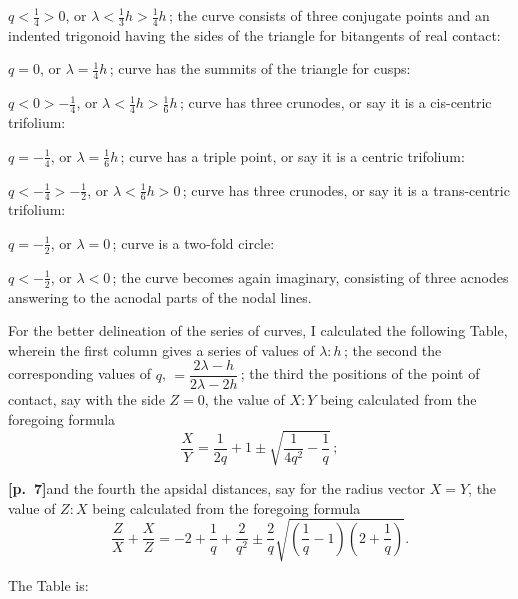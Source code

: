 \documentclass[11pt,a4paper]{article}
\begin{document}
\smallskip

$q < \tfrac{1}{4} > 0$, or $\lambda < \tfrac{1}{3}h > \tfrac{1}{4}h$\,; the curve consists of three conjugate points and an indented trigonoid having the sides of the triangle for bitangents of real contact:

\smallskip

$q = 0$, or $\lambda = \tfrac{1}{4}h$\,; curve has the summits of the triangle for cusps:

\smallskip

$q < 0 > -\tfrac{1}{4}$, or $\lambda < \tfrac{1}{4}h > \tfrac{1}{6}h$\,; curve has three crunodes, or say it is a cis-centric trifolium:

\smallskip

$q = -\tfrac{1}{4}$, or $\lambda = \tfrac{1}{6}h$\,; curve has a triple point, or say it is a centric trifolium:

\smallskip

$q < -\tfrac{1}{4} > -\tfrac{1}{2}$, or $\lambda < \tfrac{1}{6}h > 0$\,; curve has three crunodes, or say it is a trans-centric trifolium:

\smallskip

$q = -\tfrac{1}{2}$, or $\lambda = 0$\,; curve is a two-fold circle:

\smallskip

$q < -\tfrac{1}{2}$, or $\lambda < 0$\,; the curve becomes again imaginary, consisting of three acnodes answering to the acnodal parts of the nodal lines.

\bigskip

For the better delineation of the series of curves, I calculated the following Table, wherein the first column gives a series of values of $\lambda : h$\,; the second the corresponding values of $q$, $= \dfrac{2\lambda - h}{2\lambda - 2h}$\,; the third the positions of the point of contact, say with the side $Z=0$, the value of $X : Y$ being calculated from the foregoing formula
\[
\frac{X}{Y} = \frac{1}{2q} + 1 \pm \sqrt{\frac{1}{4q^{2}} - \frac{1}{q}}\,;
\]

\noindent\textbf{[p.~7]}\quad and the fourth the apsidal distances, say for the radius vector $X = Y$, the value of $Z : X$ being calculated from the foregoing formula
\[
\frac{Z}{X} + \frac{X}{Z} = -2 + \frac{1}{q} + \frac{2}{q^{2}} \pm \frac{2}{q}\sqrt{\left(\frac{1}{q} - 1\right)\left(2 + \frac{1}{q}\right)}.
\]

The Table is:

\medskip
\end{document}
